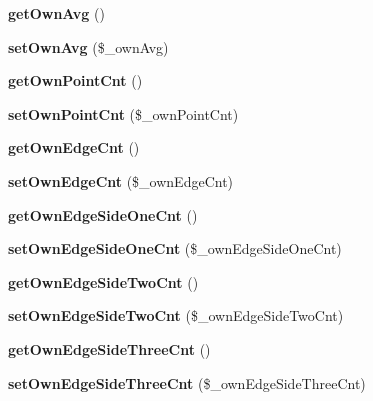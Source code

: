 \begin{DoxyCompactItemize}
{\bfseries get\+Own\+Avg} ()
\item 
\mbox{\label{class_reversi_anz_a7afbb115589b1cd369caf987326b5b83}} 
{\bfseries set\+Own\+Avg} (\$\+\_\+own\+Avg)
\item 
\mbox{\label{class_reversi_anz_aef6ff585777c6778cb8148833fc41451}} 
{\bfseries get\+Own\+Point\+Cnt} ()
\item 
\mbox{\label{class_reversi_anz_a1f532e6595b9012475d07f90715fa35f}} 
{\bfseries set\+Own\+Point\+Cnt} (\$\+\_\+own\+Point\+Cnt)
\item 
\mbox{\label{class_reversi_anz_af630ff89845fd014edd5c53b6fb9f59d}} 
{\bfseries get\+Own\+Edge\+Cnt} ()
\item 
\mbox{\label{class_reversi_anz_adb980dd708ea8224fd02212b56d3ce30}} 
{\bfseries set\+Own\+Edge\+Cnt} (\$\+\_\+own\+Edge\+Cnt)
\item 
\mbox{\label{class_reversi_anz_a04420643dba77a4d180877f38a7b20bb}} 
{\bfseries get\+Own\+Edge\+Side\+One\+Cnt} ()
\item 
\mbox{\label{class_reversi_anz_af3fbb8b287e10b57b5d926f78f94f096}} 
{\bfseries set\+Own\+Edge\+Side\+One\+Cnt} (\$\+\_\+own\+Edge\+Side\+One\+Cnt)
\item 
\mbox{\label{class_reversi_anz_aff7eba60fd808062aaa6079750000acc}} 
{\bfseries get\+Own\+Edge\+Side\+Two\+Cnt} ()
\item 
\mbox{\label{class_reversi_anz_afddabe459e1b4482aadc432141ba6fe5}} 
{\bfseries set\+Own\+Edge\+Side\+Two\+Cnt} (\$\+\_\+own\+Edge\+Side\+Two\+Cnt)
\item 
\mbox{\label{class_reversi_anz_addeed894b9ab975b3d6a1ad28a1467ad}} 
{\bfseries get\+Own\+Edge\+Side\+Three\+Cnt} ()
\item 
\mbox{\label{class_reversi_anz_a04b6cf91352234e65db3b482b5dafcd8}} 
{\bfseries set\+Own\+Edge\+Side\+Three\+Cnt} (\$\+\_\+own\+Edge\+Side\+Three\+Cnt)

\end{DoxyCompactItemize}
